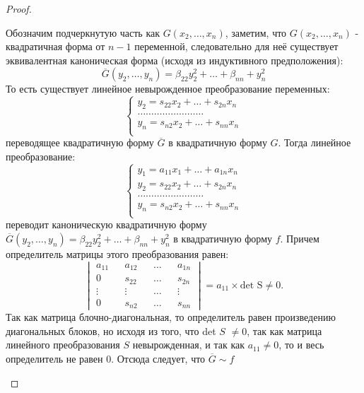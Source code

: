 \documentclass[../../main.tex]{subfiles}
\begin{document}
\begin{proof}
\begin{itemize}
	Обозначим подчеркнутую часть как $G(x_{2}, \dots, x_{n})$, заметим, что $G(x_{2}, \dots, x_{n})$ - квадратичная форма от $n - 1$ переменной, следовательно для неё существует эквивалентная каноническая форма (исходя из индуктивного предположения):
	\[
		\overline{G} (y_{2}, \dots, y_{n}) = \beta_{2 2} y^{2}_{2} + \dots + \beta_{n n} + y^{2}_{n}
	\]
	То есть существует линейное невырожденное преобразование переменных:
	\[
	\begin{cases}
		y_{2} = s_{2 2} x_{2} + \dots + s_{2 n} x_{n} \\
		\dots\dots\dots\dots\dots\dots\dots\dots\\
		y_{n} = s_{n 2} x_{2} + \dots + s_{n n} x_{n} \\
	\end{cases}
	\]
	переводящее квадратичную форму $\overline{G}$ в квадратичную форму $G$. Тогда линейное преобразование:
	\[
	\begin{cases}
		y_{1} = a_{1 1} x_{1} + \dots + a_{1 n} x_{n} \\
		y_{2} = s_{2 2} x_{2} + \dots + s_{2 n} x_{n} \\
		\dots\dots\dots\dots\dots\dots\dots\dots\\
		y_{n} = s_{n 2} x_{2} + \dots + s_{n n} x_{n} \\
	\end{cases}
	\]
	переводит каноническую квадратичную форму $\overline{G} (y_{2}, \dots, y_{n}) = \beta_{2 2} y^{2}_{2} + \dots + \beta_{n n} + y^{2}_{n}$ в квадратичную форму $f$. Причем определитель матрицы этого преобразования равен:
	\[
		\begin{vmatrix}
			a_{1 1} && a_{1 2} && \dots && a_{1 n} \\
			0 && s_{2 2} && \dots && s_{2 n} \\
			\vdots && \vdots &&  \dots && \vdots \\
			0 && s_{n 2} && \dots && s_{n n}
		\end{vmatrix}
		= a_{1 1} \times \text{det S} \ne 0\text{.}
	\]
	Так как матрица блочно-диагональная, то определитель равен произведению диагональных блоков, но исходя из того, что det $S$ $\ne 0$, так как матрица линейного преобразования $S$ невырожденная, и так как $a_{1 1} \ne 0$, то и весь определитель не равен 0. Отсюда следует, что $\overline{G} \sim f$


\end{itemize}
\end{proof}
\end{document}
